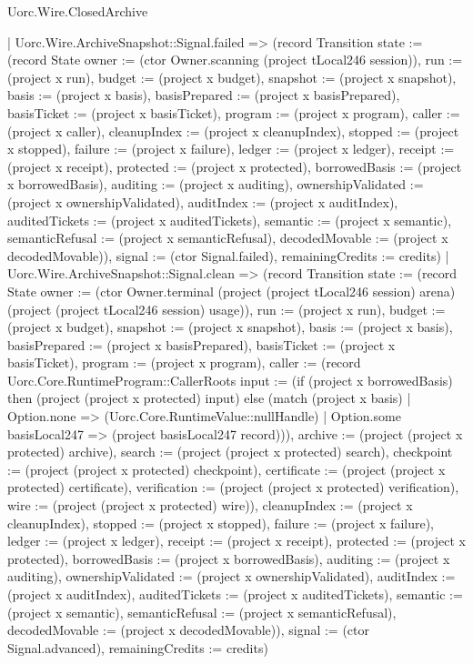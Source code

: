 \begin{lexlean}{Uorc.Wire.ClosedArchive}
\begin{semanticmodule}
{      | Uorc.Wire.ArchiveSnapshot::Signal.failed => (record Transition {state := (record State {owner := (ctor Owner.scanning (project tLocal246 session)), run := (project x run), budget := (project x budget), snapshot := (project x snapshot), basis := (project x basis), basisPrepared := (project x basisPrepared), basisTicket := (project x basisTicket), program := (project x program), caller := (project x caller), cleanupIndex := (project x cleanupIndex), stopped := (project x stopped), failure := (project x failure), ledger := (project x ledger), receipt := (project x receipt), protected := (project x protected), borrowedBasis := (project x borrowedBasis), auditing := (project x auditing), ownershipValidated := (project x ownershipValidated), auditIndex := (project x auditIndex), auditedTickets := (project x auditedTickets), semantic := (project x semantic), semanticRefusal := (project x semanticRefusal), decodedMovable := (project x decodedMovable)}), signal := (ctor Signal.failed), remainingCredits := credits})
      | Uorc.Wire.ArchiveSnapshot::Signal.clean => (record Transition {state := (record State {owner := (ctor Owner.terminal (project (project tLocal246 session) arena) (project (project tLocal246 session) usage)), run := (project x run), budget := (project x budget), snapshot := (project x snapshot), basis := (project x basis), basisPrepared := (project x basisPrepared), basisTicket := (project x basisTicket), program := (project x program), caller := (record Uorc.Core.RuntimeProgram::CallerRoots {input := (if (project x borrowedBasis) then (project (project x protected) input) else (match (project x basis)
        | Option.none => (Uorc.Core.RuntimeValue::nullHandle)
        | Option.some basisLocal247 => (project basisLocal247 record))), archive := (project (project x protected) archive), search := (project (project x protected) search), checkpoint := (project (project x protected) checkpoint), certificate := (project (project x protected) certificate), verification := (project (project x protected) verification), wire := (project (project x protected) wire)}), cleanupIndex := (project x cleanupIndex), stopped := (project x stopped), failure := (project x failure), ledger := (project x ledger), receipt := (project x receipt), protected := (project x protected), borrowedBasis := (project x borrowedBasis), auditing := (project x auditing), ownershipValidated := (project x ownershipValidated), auditIndex := (project x auditIndex), auditedTickets := (project x auditedTickets), semantic := (project x semantic), semanticRefusal := (project x semanticRefusal), decodedMovable := (project x decodedMovable)}), signal := (ctor Signal.advanced), remainingCredits := credits})
}
\end{semanticmodule}
\end{lexlean}
